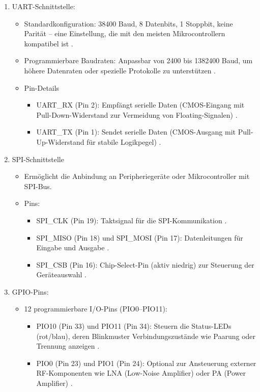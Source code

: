 \begin{enumerate}
    \item UART-Schnittstelle:
    \begin{itemize}
        \item Standardkonfiguration: 38400 Baud, 8 Datenbits, 1 Stoppbit, keine Parität – eine Einstellung, die mit den meisten Mikrocontrollern kompatibel ist \cite{HC05Datasheet:2010}.
        \item Programmierbare Baudraten: Anpassbar von 2400 bis 1382400 Baud, um höhere Datenraten oder spezielle Protokolle zu unterstützen \cite{ReicheltHC05:2025}.
        \item Pin-Details
        \begin{itemize}
            \item UART\_RX (Pin 2): Empfängt serielle Daten (CMOS-Eingang mit Pull-Down-Widerstand zur Vermeidung von Floating-Signalen) \cite{HC05Datasheet:2010}.
            \item UART\_TX (Pin 1): Sendet serielle Daten (CMOS-Ausgang mit Pull-Up-Widerstand für stabile Logikpegel) \cite{HC05Datasheet:2010}.
        \end{itemize}
    \end{itemize} 
    \item SPI-Schnittstelle 
    \begin{itemize}
        \item Ermöglicht die Anbindung an Peripheriegeräte oder Mikrocontroller mit SPI-Bus.
        \item Pins:
        \begin{itemize}
            \item SPI\_CLK (Pin 19): Taktsignal für die SPI-Kommunikation \cite{HC05Datasheet:2010}.
            \item SPI\_MISO (Pin 18) und SPI\_MOSI (Pin 17): Datenleitungen für Eingabe und Ausgabe \cite{HC05Datasheet:2010}.
            \item SPI\_CSB (Pin 16): Chip-Select-Pin (aktiv niedrig) zur Steuerung der Geräteauswahl \cite{HC05Datasheet:2010}.
        \end{itemize}
    \end{itemize}
    \item GPIO-Pins: 
    \begin{itemize}
        \item 12 programmierbare I/O-Pins (PIO0–PIO11):
        \begin{itemize}
            \item PIO10 (Pin 33) und PIO11 (Pin 34): Steuern die Status-LEDs (rot/blau), deren Blinkmuster Verbindungszustände wie Paarung oder Trennung anzeigen \cite{HC05Datasheet:2010}.
            \item PIO0 (Pin 23) und PIO1 (Pin 24): Optional zur Ansteuerung externer RF-Komponenten wie LNA (Low-Noise Amplifier) oder PA (Power Amplifier) \cite{HC05Datasheet:2010}.
        \end{itemize}
    \end{itemize}
    
\end{enumerate}

